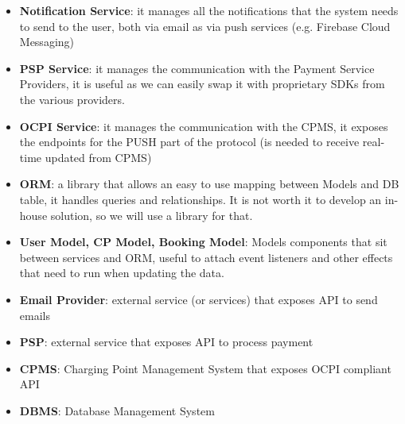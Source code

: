 \begin{itemize}
	\item \textbf{Notification Service}: it manages all the notifications that the system needs to send to the user, both via email as via push services (e.g. Firebase Cloud Messaging)
	\item \textbf{PSP Service}: it manages the communication with the Payment Service Providers, it is useful as we can easily swap it with proprietary SDKs from the various providers.
	\item \textbf{OCPI Service}: it manages the communication with the CPMS, it exposes the endpoints for the PUSH part of the protocol (is needed to receive real-time updated from CPMS)
	\item \textbf{ORM}: a library that allows an easy to use mapping between Models and DB table, it handles queries and relationships. It is not worth it to develop an in-house solution, so we will use a library for that.
	\item \textbf{User Model, CP Model, Booking Model}: Models components that sit between services and ORM, useful to attach event listeners and other effects that need to run when updating the data. 
	\item \textbf{Email Provider}: external service (or services) that exposes API to send emails
	\item \textbf{PSP}: external service that exposes API to process payment
	\item \textbf{CPMS}: Charging Point Management System that exposes OCPI compliant API
	\item \textbf{DBMS}: Database Management System
\end{itemize}




















